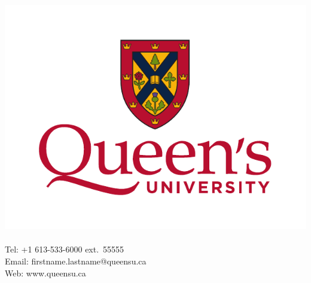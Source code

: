\documentclass[fleqn]{qu-slides}
\begin{document}
\SlideThemeGrey
\begin{frame}
    \begin{columns}
        \centering
        \includegraphics[width=\textwidth]{logo/qu-logo-vertical-colour.pdf}
        {\large\bf \insertauthor} \\
        \small \insertinstitute \\
        Tel: +1 613-533-6000 ext.\ 55555 \\
        Email: firstname.lastname@queensu.ca \\
        Web: www.queensu.ca
    \end{columns}
\end{frame}

\end{document}
